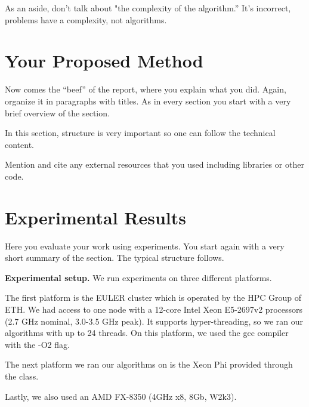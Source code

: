 \documentclass[letterpaper]{article}
\newcommand{\mypar}[1]{{\bf #1.}}
\begin{document}
As an aside, don't talk about "the complexity of the algorithm.'' It's incorrect,
problems have a complexity, not algorithms.


\section{Your Proposed Method}\label{sec:yourmethod}

Now comes the ``beef'' of the report, where you explain what you
did. Again, organize it in paragraphs with titles. As in every section
you start with a very brief overview of the section.

In this section, structure is very important so one can follow the technical content.

Mention and cite any external resources that you used including libraries or other code.

\section{Experimental Results}\label{sec:exp}

Here you evaluate your work using experiments. You start again with a
very short summary of the section. The typical structure follows.

\mypar{Experimental setup}
%
We run experiments on three different platforms.

The first platform is the EULER cluster which is operated by the HPC Group of ETH. We had access to one node with a 12-core Intel Xeon E5-2697v2 processors (2.7 GHz nominal, 3.0-3.5 GHz peak). It supports hyper-threading, so we ran our algorithms with up to 24 threads. On this platform, we used the gcc compiler with the -O2 flag.

The next platform we ran our algorithms on is the Xeon Phi provided through the class.

Lastly, we also used an AMD FX-8350 (4GHz x8, 8Gb, W2k3).
\end{document}

